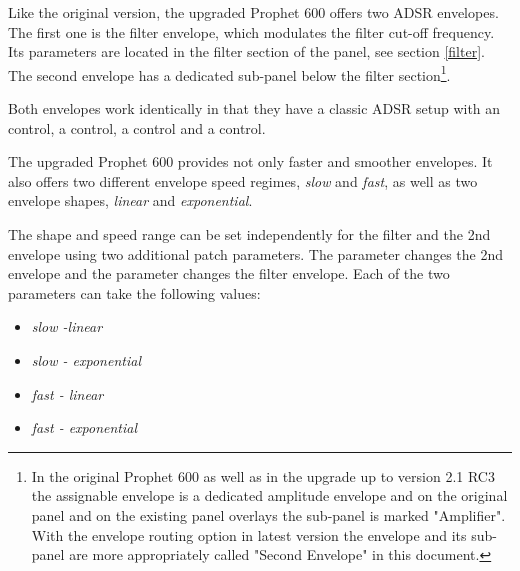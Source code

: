 Like the original version, the upgraded Prophet 600 offers two ADSR envelopes. The first one is the filter envelope, which modulates the filter cut-off frequency. Its parameters are located in the filter section of the panel, see section \ref{filter}. The second envelope has a dedicated sub-panel below the filter section\footnote{In the original Prophet 600 as well as in the upgrade up to version 2.1 RC3 the assignable envelope is a dedicated amplitude envelope and on the original panel and on the existing panel overlays the sub-panel is marked "Amplifier". With the envelope routing option in latest version the envelope and its sub-panel are more appropriately called "Second Envelope" in this document.}.

Both envelopes work identically in that they have a classic ADSR setup with an \attack control, a \decay control, a \sustain control and a \release control. 

\begin{center}
\end{center}

The upgraded Prophet 600 provides not only faster and smoother envelopes. It also offers two different envelope speed regimes, \textit{slow} and \textit{fast}, as well as two envelope shapes, \textit{linear} and \textit{exponential}.

The shape and speed range can be set independently for the filter and the 2nd envelope using two additional patch parameters. The parameter \secndenv changes the 2nd envelope and the parameter \filenv changes the filter envelope. Each of the two parameters can take the following values:

\begin{itemize}
  \setlength\itemsep{0cm}
  \item \textit{slow -linear}
  \item \textit{slow - exponential}
  \item \textit{fast - linear}
  \item \textit{fast - exponential}
\end{itemize}
 
